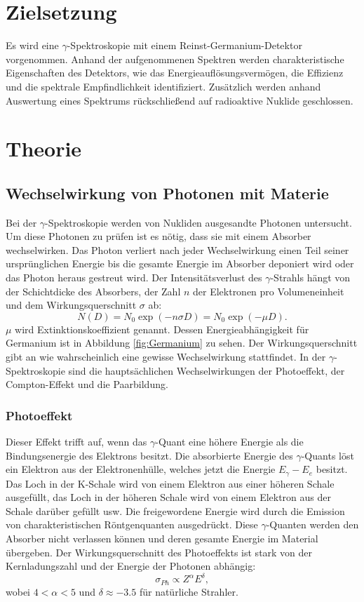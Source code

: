 \section{Zielsetzung}
\label{sec:Zielsetzung}
Es wird eine $\gamma$-Spektroskopie mit einem Reinst-Germanium-Detektor vorgenommen.
Anhand der aufgenommenen Spektren werden charakteristische Eigenschaften des Detektors, wie das Energieauflösungsvermögen, die Effizienz und die spektrale Empfindlichkeit identifiziert.
Zusätzlich werden anhand Auswertung eines Spektrums rückschließend auf radioaktive Nuklide geschlossen.

\section{Theorie}
\label{sec:Theorie}

\subsection{Wechselwirkung von Photonen mit Materie}
Bei der $\gamma$-Spektroskopie werden von Nukliden ausgesandte Photonen untersucht.
Um diese Photonen zu prüfen ist es nötig, dass sie mit einem Absorber wechselwirken.
Das Photon verliert nach jeder Wechselwirkung einen Teil seiner ursprünglichen Energie bis die gesamte Energie im Absorber deponiert wird oder das Photon heraus gestreut wird.
Der Intensitätsverlust des $\gamma$-Strahls hängt von der Schichtdicke des Absorbers, der Zahl $n$ der Elektronen pro Volumeneinheit und dem Wirkungsquerschnitt $\sigma$ ab:
\begin{equation}
\label{eq:Absorbtion}
N(D)=N_0\exp(-n\sigma D)=N_0\exp(-\mu D).
\end{equation}
$\mu$ wird Extinktionskoeffizient genannt.
Dessen Energieabhängigkeit für Germanium ist in Abbildung \ref{fig:Germanium} zu sehen.
Der Wirkungsquerschnitt gibt an wie wahrscheinlich eine gewisse Wechselwirkung stattfindet.
In der $\gamma$-Spektroskopie sind die hauptsächlichen Wechselwirkungen der Photoeffekt, der Compton-Effekt und die Paarbildung.

\subsubsection{Photoeffekt}
Dieser Effekt trifft auf, wenn das $\gamma$-Quant eine höhere Energie als die Bindungsenergie des Elektrons besitzt.
Die absorbierte Energie des $\gamma$-Quants löst ein Elektron aus der Elektronenhülle, welches jetzt die Energie $E_\gamma-E_e$ besitzt.
Das Loch in der K-Schale wird von einem Elektron aus einer höheren Schale ausgefüllt, das Loch in der höheren Schale wird von einem Elektron aus der Schale darüber gefüllt usw.
Die freigewordene Energie wird durch die Emission von charakteristischen Röntgenquanten ausgedrückt.
Diese $\gamma$-Quanten werden den Absorber nicht verlassen können und deren gesamte Energie im Material übergeben.
Der Wirkungsquerschnitt des Photoeffekts ist stark von der Kernladungszahl und der Energie der Photonen abhängig:
\begin{equation*}
\sigma_{Ph}\propto Z^\alpha E^\delta,
\end{equation*}
wobei $4<\alpha<5$ und $\delta\approx -3.5$ für natürliche Strahler.

